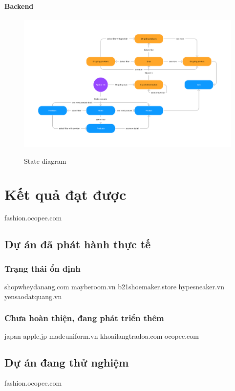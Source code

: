 \documentclass[11pt]{report}
\begin{document}
\paragraph{Backend}
%	
\begin{figure}[h!]
	\caption{State diagram \cite{web:mongo:why}}
	\centering
	\includegraphics[width=\textwidth]{state.png}
	\label{fig:state}
\end{figure}
%
\section{Kết quả đạt được}

{\Huge fashion.ocopee.com}

\subsection{Dự án đã phát hành thực tế}

\subsubsection{Trạng thái ổn định}

shopwheydanang.com
mayberoom.vn
b21shoemaker.store
hypesneaker.vn
yensaodatquang.vn

\subsubsection{Chưa hoàn thiện, đang phát triển thêm}

japan-apple.jp
madeuniform.vn
khoailangtradoa.com
ocopee.com

\subsection{Dự án đang thử nghiệm}
fashion.ocopee.com
\end{document}
